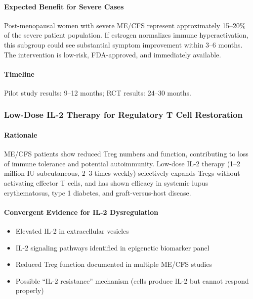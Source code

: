 \paragraph{Expected Benefit for Severe Cases}
Post-menopausal women with severe ME/CFS represent approximately 15--20\% of the severe patient population. If estrogen normalizes immune hyperactivation, this subgroup could see substantial symptom improvement within 3--6 months. The intervention is low-risk, FDA-approved, and immediately available.

\paragraph{Timeline}
Pilot study results: 9--12 months; RCT results: 24--30 months.

\subsubsection{Low-Dose IL-2 Therapy for Regulatory T Cell Restoration}

\paragraph{Rationale}
ME/CFS patients show reduced Treg numbers and function, contributing to loss of immune tolerance and potential autoimmunity. Low-dose IL-2 therapy (1--2 million IU subcutaneous, 2--3 times weekly) selectively expands Tregs without activating effector T cells, and has shown efficacy in systemic lupus erythematosus, type 1 diabetes, and graft-versus-host disease.

\paragraph{Convergent Evidence for IL-2 Dysregulation}
\begin{itemize}
    \item Elevated IL-2 in extracellular vesicles~\cite{Giloteaux2023}
    \item IL-2 signaling pathways identified in epigenetic biomarker panel~\cite{Hunter2025}
    \item Reduced Treg function documented in multiple ME/CFS studies
    \item Possible ``IL-2 resistance'' mechanism (cells produce IL-2 but cannot respond properly)
\end{itemize}

